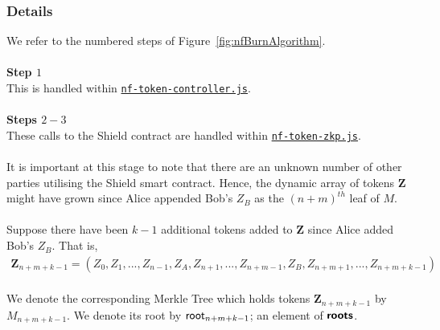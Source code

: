 \newpage
\subsubsection{Details}
\label{sec:721BurnDetails}

We refer to the numbered steps of Figure~\ref{fig:nfBurnAlgorithm}.\\
\\

\textbf{Step $1$}
\ \\
This is handled within \hyperref[sec:nf-token-controller]{\texttt{nf-token-controller.js}}.\\
\\

\textbf{Steps $2 - 3$}
\ \\
These calls to the Shield contract are handled within \hyperref[sec:nf-token-zkp]{\texttt{nf-token-zkp.js}}.\\
\\
\noindent
It is important at this stage to note that there are an unknown number of other parties utilising the Shield smart contract.
Hence, the dynamic array of tokens $\bm{Z}$ might have grown since Alice appended Bob's $Z_B$ as the $(n+m)^{th}$ leaf of $M$.\\
\\
Suppose there have been $k-1$ additional tokens added to $\bm{Z}$ since Alice added Bob's $Z_B$.
That is,\\
\begin{align*}
  \bm{Z}_{n+m+k-1} = (Z_0, Z_1,..., Z_{n-1}, Z_A,
  Z_{n+1},..., Z_{n+m-1}, Z_B, Z_{n+m+1},..., Z_{n+m+k-1})
\end{align*}
\ \\
\noindent
We denote the corresponding Merkle Tree which holds tokens $\bm{Z}_{n+m+k-1}$ by $M_{n+m+k-1}$. We denote its root by $\mathsf{root}_{n+m+k-1}$; an element of $\bm{\mathsf{roots}}$.



